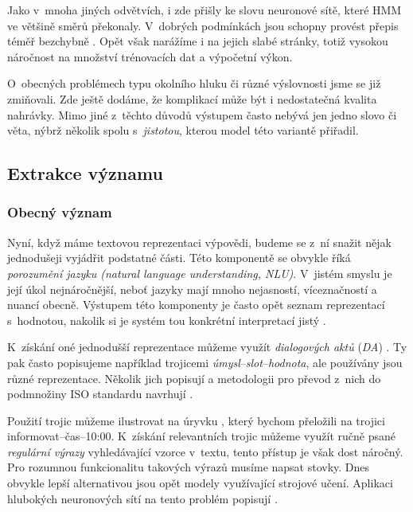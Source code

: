 Jako v~mnoha jiných odvětvích, i zde přišly ke slovu neuronové sítě, které HMM
ve většině směrů překonaly. V~dobrých podmínkách jsou schopny provést přepis
téměř bezchybně \citep{zhang_pushing_2020}. Opět však narážíme i na jejich slabé stránky,
totiž vysokou náročnost na množství trénovacích dat a výpočetní výkon.

O~obecných problémech typu okolního hluku či různé výslovnosti jsme se
již zmiňovali. Zde ještě dodáme, že komplikací může být i nedostatečná kvalita
nahrávky. Mimo jiné z~těchto důvodů výstupem často nebývá jen jedno
slovo či věta, nýbrž několik spolu s~\textit{jistotou}, kterou model této
variantě přiřadil.

\subsection{Extrakce významu}\label{nlu}

\subsubsection{Obecný význam}
Nyní, když máme textovou reprezentaci výpovědi, budeme se z~ní snažit nějak
jednodušeji vyjádřit podstatné části. Této komponentě se obvykle říká
\textit{porozumění jazyku (natural language understanding, NLU)}. V~jistém
smyslu je její úkol nejnáročnější, neboť jazyky mají mnoho nejasností,
víceznačností a nuancí obecně. Výstupem této komponenty je často opět
seznam reprezentací s~hodnotou, nakolik si je systém tou konkrétní
interpretací jistý \citep[sekce 4.3]{gao_neural_2019}.

K~získání oné jednodušší reprezentace můžeme využít \textit{dialogových aktů}
(\textit{DA}) \citep[strana 494]{jurafsky_slp_2020}. Ty pak
často popisujeme například trojicemi \textit{úmysl}--\textit{slot}--\textit{hodnota},
ale používány jsou různé reprezentace. Několik jich popisují a
metodologii pro převod z~nich do podmnožiny
ISO standardu navrhují \citet{mezza_iso-standard_2018}.

Použití trojic můžeme ilustrovat na úryvku , který bychom
přeložili na trojici
informovat--čas--10:00. K~získání relevantních trojic můžeme využít ručně
psané \textit{regulární výrazy} vyhledávající vzorce v~textu, tento přístup
je však dost náročný. Pro rozumnou funkcionalitu takových výrazů musíme napsat
stovky. Dnes obvykle lepší alternativou jsou opět modely využívající strojové
učení. Aplikaci hlubokých neuronových sítí na tento problém
popisují \citet{liu_multi-task_2019}.

